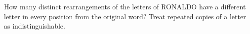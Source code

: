 How many distinct rearrangements of the letters of RONALDO have a different letter in every position from the original word? Treat repeated copies of a letter as indistinguishable.
